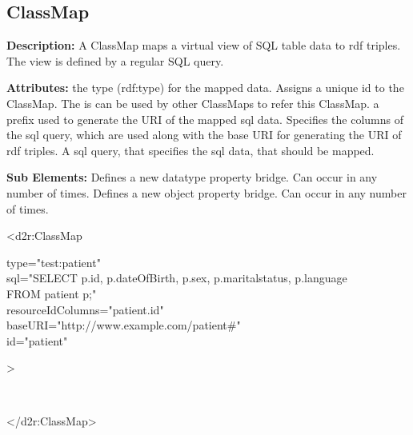 \subsection{ClassMap}
\textbf{Description:} \newline
A ClassMap maps a virtual view of SQL table data to rdf triples. The view is defined by a regular SQL query.

\textbf{Attributes:} \newline
{}
the type (rdf:type) for the mapped data.
\EndAttribute
{}
Assigns a unique id to the ClassMap. The is can be used by other ClassMaps to refer this ClassMap.
\EndAttribute
{}
a prefix used to generate the URI of the mapped sql data.
\EndAttribute
{}
Specifies the columns of the sql query, which are used along with the base URI for generating the URI of rdf triples.
\EndAttribute
{}
A sql query, that specifies the sql data, that should be mapped.
\EndAttribute

\textbf{Sub Elements:} \newline
{}
Defines a new datatype property bridge. Can occur in any number of times.
\EndAttribute
{}
Defines a new object property bridge. Can occur in any number of times.
\EndAttribute

\begin{ExampleBox}
	<d2r:ClassMap 
	\begin{indention}{1cm}
		type="test:patient"\\
		sql="SELECT p.id, p.dateOfBirth, p.sex, p.maritalstatus, p.language\\ 
		FROM patient p;"\\
		resourceIdColumns="patient.id"\\
		baseURI="http://www.example.com/patient\#"\\
		id="patient"
	\end{indention}
	>

	\begin{indention}{1cm}
		\\
	\end{indention}	
	
	</d2r:ClassMap>
\end{ExampleBox}

